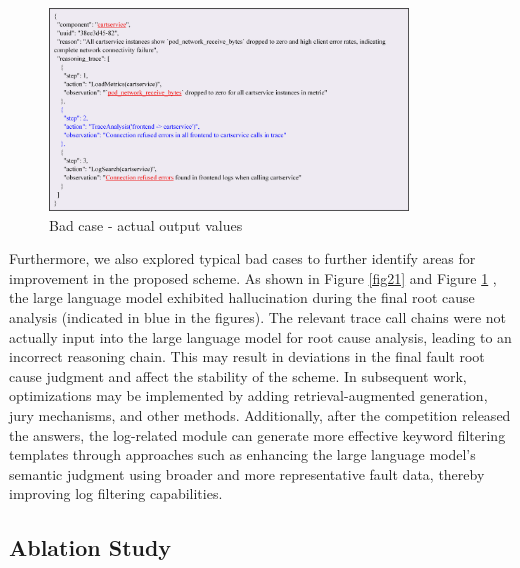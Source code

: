 \documentclass[10pt]{article}
\let\oldref\ref
\renewcommand{\ref}[1]{%
    \textcolor{blue}{\oldref{#1}}%
}
\begin{document}
\begin{figure}[!t]
    \centering
    \includegraphics[width=0.85\textwidth]{pics/fig22.png}
    \caption{Bad case - actual output values}
    \label{fig22}
\end{figure}

Furthermore, we also explored typical bad cases to further identify areas for improvement in the proposed scheme. As shown in Figure \ref{fig21} and Figure \ref{fig22}, the large language model exhibited hallucination during the final root cause analysis (indicated in blue in the figures). The relevant trace call chains were not actually input into the large language model for root cause analysis, leading to an incorrect reasoning chain. This may result in deviations in the final fault root cause judgment and affect the stability of the scheme. In subsequent work, optimizations may be implemented by adding retrieval-augmented generation, jury mechanisms, and other methods. Additionally, after the competition released the answers, the log-related module can generate more effective keyword filtering templates through approaches such as enhancing the large language model's semantic judgment using broader and more representative fault data, thereby improving log filtering capabilities.

\subsection{Ablation Study}
\end{document}
